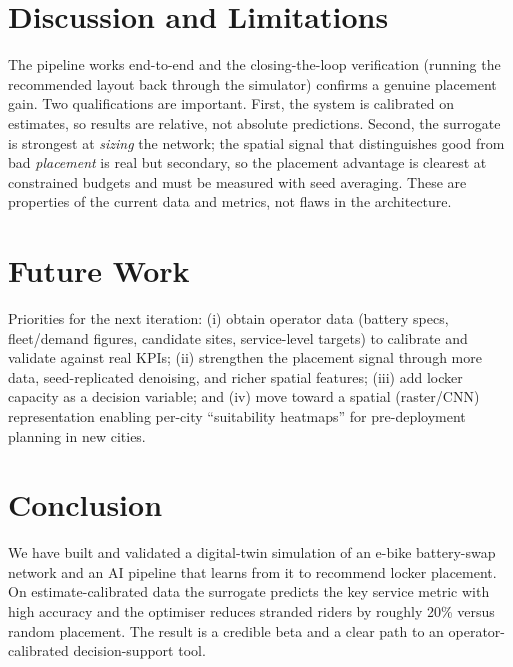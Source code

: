 \documentclass[9pt,a4paper,twocolumn,twoside]{rho-class/rho}
\begin{document}
\section{Discussion and Limitations}

    The pipeline works end-to-end and the closing-the-loop verification (running
    the recommended layout back through the simulator) confirms a genuine
    placement gain. Two qualifications are important. First, the system is
    calibrated on estimates, so results are relative, not absolute predictions.
    Second, the surrogate is strongest at \emph{sizing} the network; the spatial
    signal that distinguishes good from bad \emph{placement} is real but
    secondary, so the placement advantage is clearest at constrained budgets and
    must be measured with seed averaging. These are properties of the current
    data and metrics, not flaws in the architecture.

\section{Future Work}

    Priorities for the next iteration: (i) obtain operator data (battery specs,
    fleet/demand figures, candidate sites, service-level targets) to calibrate
    and validate against real KPIs; (ii) strengthen the placement signal through
    more data, seed-replicated denoising, and richer spatial features; (iii) add
    locker capacity as a decision variable; and (iv) move toward a spatial
    (raster/CNN) representation enabling per-city ``suitability heatmaps'' for
    pre-deployment planning in new cities.

\section{Conclusion}

    We have built and validated a digital-twin simulation of an e-bike
    battery-swap network and an AI pipeline that learns from it to recommend
    locker placement. On estimate-calibrated data the surrogate predicts the
    key service metric with high accuracy and the optimiser reduces stranded
    riders by roughly 20\% versus random placement. The result is a credible
    beta and a clear path to an operator-calibrated decision-support tool.


\printbibliography

\end{document}
